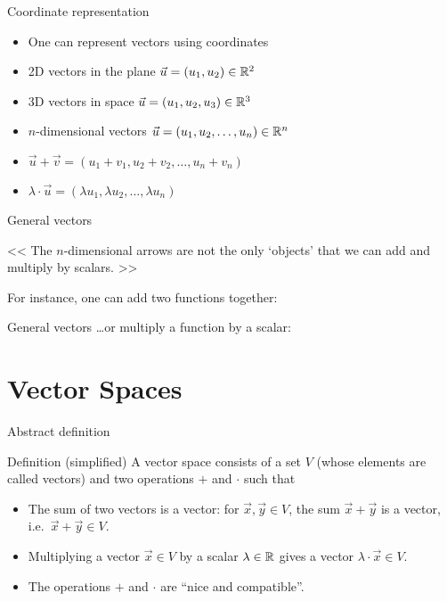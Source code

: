 \documentclass{beamer}
\begin{document}
\begin{frame}[t]{Coordinate representation}
	\begin{itemize}
		\item One can represent vectors using coordinates
		\item 2D vectors in the plane $\vec{u} = (u_1,u_2) \in \mathbb{R}^2$
		\item 3D vectors in space $\vec{u} = (u_1,u_2,u_3) \in \mathbb{R}^3$
		\item $n$-dimensional vectors  $\vec{u} = (u_1,u_2,\dots, u_n) \in \mathbb{R}^n$
	\end{itemize}
	\vspace{3.5cm}
	\begin{itemize}
		\item $\vec{u} + \vec{v} = (u_1 + v_1,u_2 + v_2,\dots, u_n + v_n)$
		\item $\lambda \cdot \vec{u}= (\lambda u_1,\lambda u_2,\dots, \lambda u_n)$
	\end{itemize}
\end{frame}

\begin{frame}[t]{General vectors}
	\begin{center}
		<< The $n$-dimensional arrows are not the only `objects' that we can add and multiply by scalars. >>
	\end{center}

	For instance, one can add two functions together:
\end{frame}

\begin{frame}[t]{General vectors}
	\dots or multiply a function by a scalar:
\end{frame}

\section{Vector Spaces}

\begin{frame}{Abstract definition}
	\begin{block}{Definition (simplified)}
		A vector space consists of a set $V$ (whose elements are called vectors) and two operations $+$ and $\cdot$ such that
		\begin{itemize}
			\item The sum of two vectors is a vector: for $\vec{x}, \vec{y} \in V$, the sum $\vec{x}+\vec{y}$ is a vector, i.e.\ $\vec{x} + \vec{y} \in V$.
			\item Multiplying a vector $\vec{x} \in V$ by a scalar $\lambda \in \mathbb{R}$ gives a vector $\lambda \cdot \vec{x} \in V$.
			\item The operations $+$ and $\cdot$ are ``nice and compatible''.
		\end{itemize}
	\end{block}
\end{frame}
\end{document}
